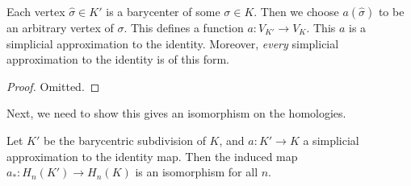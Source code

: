 \documentclass[a4paper]{article}
\begin{document}
\begin{lemma}
  Each vertex $\hat{\sigma} \in K'$ is a barycenter of some $\sigma \in K$. Then we choose $a(\hat{\sigma})$ to be an arbitrary vertex of $\sigma$. This defines a function $a: V_{K'} \to V_K$. This $a$ is a simplicial approximation to the identity. Moreover, \emph{every} simplicial approximation to the identity is of this form.
\end{lemma}

\begin{proof}
  Omitted. %
\end{proof}

Next, we need to show this gives an isomorphism on the homologies.

\begin{prop}
  Let $K'$ be the barycentric subdivision of $K$, and $a: K' \to K$ a simplicial approximation to the identity map. Then the induced map $a_*: H_n(K') \to H_n(K)$ is an isomorphism for all $n$.
\end{prop}
\end{document}

